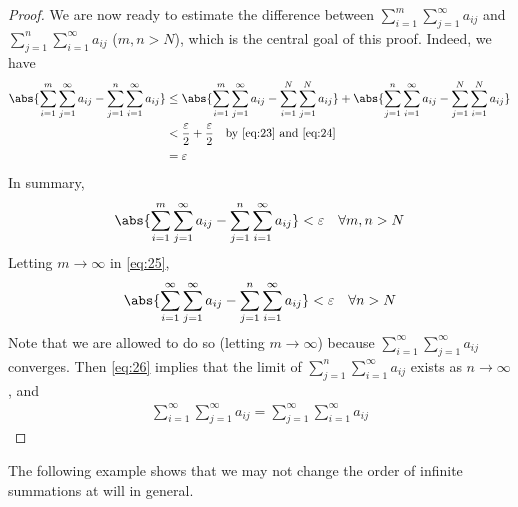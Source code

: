 \documentclass[thmcnt=section, 12pt]{elegantbook}
\begin{document}
\begin{proof}
    \par We are now ready to estimate the difference between $\sum_{i=1}^m \sum_{j=1}^\infty a_{ij}$ and $\sum_{j=1}^n \sum_{i=1}^\infty a_{ij}$ ($m, n > N$), which is the central goal of this proof. Indeed, we have 
    \begin{align*}
        \abs{
            \sum_{i=1}^m \sum_{j=1}^\infty a_{ij}
            - \sum_{j=1}^n \sum_{i=1}^\infty a_{ij}
        } &\leq \abs{
            \sum_{i=1}^m \sum_{j=1}^\infty a_{ij}
            - \sum_{i=1}^N \sum_{j=1}^N a_{ij}
        } + \abs{
            \sum_{j=1}^n \sum_{i=1}^\infty a_{ij}
            - \sum_{j=1}^N \sum_{i=1}^N a_{ij}
        } \\ 
        &< \frac{\varepsilon}{2} + \frac{\varepsilon}{2}
        \quad \text{by \eqref{eq:23} and \eqref{eq:24}} \\ 
        &= \varepsilon
    \end{align*} 
    In summary,
    \begin{align}
        \abs{
            \sum_{i=1}^m \sum_{j=1}^\infty a_{ij}
            - \sum_{j=1}^n \sum_{i=1}^\infty a_{ij}
        } < \varepsilon
        \quad \forall m, n > N
        \label{eq:25}
    \end{align}
    Letting $m \to \infty$ in \eqref{eq:25},
    \begin{align}
        \abs{
            \sum_{i=1}^\infty \sum_{j=1}^\infty a_{ij}
            - \sum_{j=1}^n \sum_{i=1}^\infty a_{ij}
        } < \varepsilon
        \quad \forall n > N
        \label{eq:26}
    \end{align}
    Note that we are allowed to do so (letting $m \to \infty$) because $\sum_{i=1}^\infty \sum_{j=1}^\infty a_{ij}$ converges.
    Then \eqref{eq:26} implies that the limit of $\sum_{j=1}^n \sum_{i=1}^\infty a_{ij}$ exists as $n \to \infty$, and 
    \begin{align*}
        \sum_{i=1}^\infty \sum_{j=1}^\infty a_{ij}
        = \sum_{j=1}^\infty \sum_{i=1}^\infty a_{ij}
    \end{align*}
\end{proof}


\par The following example shows that we may not change the order of infinite summations at will in general.
\end{document}
